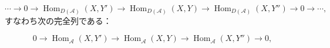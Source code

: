 \[
\cdots\longrightarrow0\longrightarrow
\operatorname{Hom}_{D(\mathcal A)}(X,Y')\longrightarrow
\operatorname{Hom}_{D(\mathcal A)}(X,Y)\longrightarrow
\operatorname{Hom}_{D(\mathcal A)}(X,Y'')\longrightarrow0
\longrightarrow\cdots,
\]
すなわち次の完全列である：

\[
0\longrightarrow\operatorname{Hom}_{\mathcal A}(X,Y')
\longrightarrow\operatorname{Hom}_{\mathcal A}(X,Y)
\longrightarrow\operatorname{Hom}_{\mathcal A}(X,Y'')
\longrightarrow0,
\]
\endgroup
